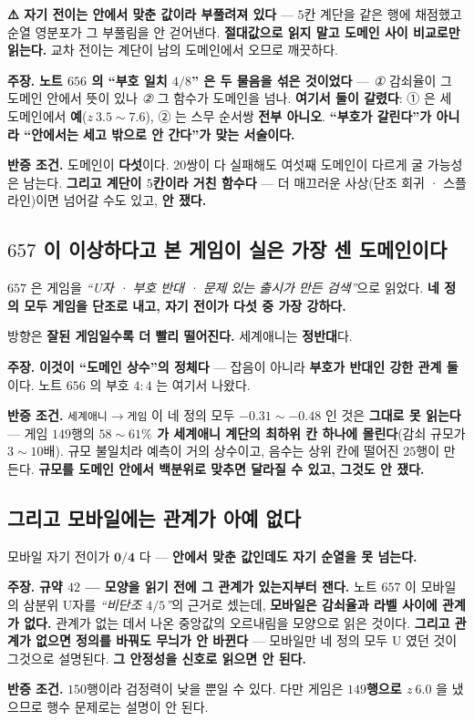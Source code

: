 \documentclass[10pt,a4paper]{article}
\newcommand{\claim}[2]{\begin{claimbox}\textbf{주장.} #1\par\smallskip
  \textcolor{gray!70}{\textbf{반증 조건.} #2}\end{claimbox}}
\begin{document}
\textbf{⚠️ 자기 전이는 안에서 맞춘 값이라 부풀려져 있다} --- $5$칸 계단을 같은 행에
채점했고 순열 영분포가 그 부풀림을 안 걷어낸다. \textbf{절대값으로 읽지 말고
도메인 사이 비교로만 읽는다.} 교차 전이는 계단이 남의 도메인에서 오므로 깨끗하다.

\claim{\textbf{노트 $656$ 의 ``부호 일치 $4/8$'' 은 두 물음을 섞은 것이었다} ---
\emph{①} 감쇠율이 그 도메인 안에서 뜻이 있나 \emph{②} 그 함수가 도메인을 넘나.
\textbf{여기서 둘이 갈렸다}: ① 은 세 도메인에서 \textbf{예}($z\ 3.5{\sim}7.6$),
② 는 스무 순서쌍 \textbf{전부 아니오}. \textbf{``부호가 갈린다''가 아니라
``안에서는 세고 밖으로 안 간다''가 맞는 서술이다.}}
{도메인이 \textbf{다섯}이다. $20$쌍이 다 실패해도 여섯째 도메인이 다르게 굴
가능성은 남는다. \textbf{그리고 계단이 $5$칸이라 거친 함수다} --- 더 매끄러운
사상(단조 회귀 · 스플라인)이면 넘어갈 수도 있고, \textbf{안 쟀다.}}

\subsection*{$657$ 이 이상하다고 본 게임이 실은 가장 센 도메인이다}

$657$ 은 게임을 \emph{``U자 · 부호 반대 · 문제 있는 출시가 만든 검색''}으로 읽었다.
\textbf{네 정의 모두 게임을 단조로 내고, 자기 전이가 다섯 중 가장 강하다.}

방향은 \textbf{잘된 게임일수록 더 빨리 떨어진다.} 세계애니는 \textbf{정반대}다.

\claim{\textbf{이것이 ``도메인 상수''의 정체다} --- 잡음이 아니라 \textbf{부호가
반대인 강한 관계 둘}이다. 노트 $656$ 의 부호 $4{:}4$ 는 여기서 나왔다.}
{\texttt{세계애니}$\to$\texttt{게임} 이 네 정의 모두 $-0.31 \sim -0.48$ 인 것은
\textbf{그대로 못 읽는다} --- 게임 $149$행의 \textbf{$58{\sim}61\%$ 가 세계애니
계단의 최하위 칸 하나에 몰린다}(감쇠 규모가 $3{\sim}10$배). 규모 불일치라 예측이
거의 상수이고, 음수는 상위 칸에 떨어진 $25$행이 만든다. \textbf{규모를 도메인 안에서
백분위로 맞추면 달라질 수 있고, 그것도 안 쟀다.}}

\subsection*{그리고 모바일에는 관계가 아예 없다}

모바일 자기 전이가 $\mathbf{0/4}$ 다 --- \textbf{안에서 맞춘 값인데도 자기 순열을 못
넘는다.}

\claim{\textbf{규약 $42$ --- 모양을 읽기 전에 그 관계가 있는지부터 잰다.} 노트
$657$ 이 모바일의 삼분위 U자를 \emph{``비단조 $4/5$''}의 근거로 셌는데,
\textbf{모바일은 감쇠율과 라벨 사이에 관계가 없다.} 관계가 없는 데서 나온 중앙값의
오르내림을 모양으로 읽은 것이다. \textbf{그리고 관계가 없으면 정의를 바꿔도 무늬가
안 바뀐다} --- 모바일만 네 정의 모두 U 였던 것이 그것으로 설명된다.
\textbf{그 안정성을 신호로 읽으면 안 된다.}}
{$150$행이라 검정력이 낮을 뿐일 수 있다. 다만 게임은 \textbf{$149$행으로 $z\ 6.0$}
을 냈으므로 행수 문제로는 설명이 안 된다.}
\end{document}
